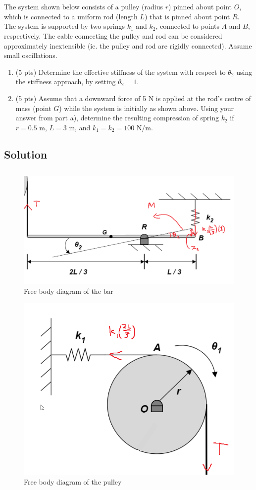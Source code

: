 \section{}
The system shown below consists of a pulley (radius $r$) pinned about point $O$, which is connected
to a uniform rod (length $L$) that is pinned about point $R$. The system is supported by two springs
$k_1$ and $k_2$, connected to points $A$ and $B$, respectively. The cable connecting the pulley and
rod can be considered approximately inextensible (ie. the pulley and rod are rigidly connected).
Assume small oscillations.

\begin{enumerate}[label=(\alph*)]
    \item (5 pts) Determine the effective stiffness of the system with respect to $\theta_2$ using
        the stiffness approach, by setting $\theta_2 = 1$.
    \item (5 pts) Assume that a downward force of 5 N is applied at the rod's centre of mass (point
        $G$) while the system is initially as shown above. Using your answer from part a), determine
        the resulting compression of spring $k_2$ if $r = 0.5$ m, $L = 3$ m, and $k_1 = k_2 = 100$
        N/m.
\end{enumerate}

\subsection*{Solution}
\subsection{}
\begin{figure}[h]
    \centering
    \includegraphics[width=0.5\linewidth]{Questions/Figures/q2 bar fbd.png}
    \caption{Free body diagram of the bar}
    \label{fig:q2_bar_fbd-png}
\end{figure}
\begin{figure}[h]
    \centering
    \includegraphics[width=0.5\linewidth]{Questions/Figures/q2 pulley fbd.png}
    \caption{Free body diagram of the pulley}
    \label{fig:q2_pulley_fbd-png}
\end{figure}


